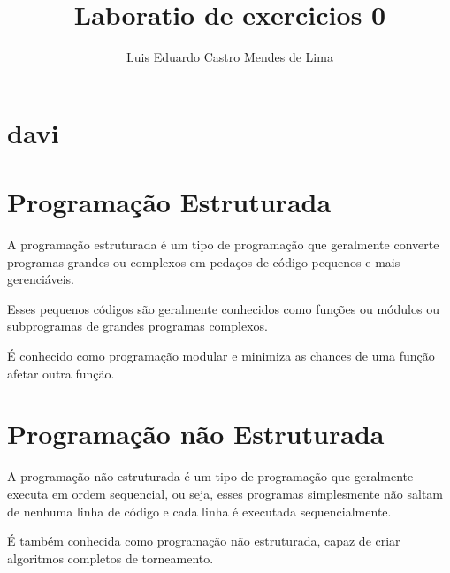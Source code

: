\documentclass[12pt,a4paper]{abntex2}
\title{Laboratio de exercicios 0}
\author{Luis Eduardo Castro Mendes de Lima}
\begin{document}
\maketitle
\section {davi }
\section{Programação Estruturada}

A programação estruturada é um tipo de programação que geralmente converte programas grandes ou
complexos em pedaços de código pequenos e mais gerenciáveis.

Esses pequenos códigos são geralmente conhecidos como funções ou módulos ou subprogramas de
grandes programas complexos.

É conhecido como programação modular e minimiza as chances de uma função afetar outra função.


\section{Programação não Estruturada}

 A programação não estruturada é um tipo de programação que geralmente executa em ordem
 sequencial, ou seja, esses programas simplesmente não saltam de nenhuma linha de código e
 cada linha é executada sequencialmente.

 É também conhecida como programação não estruturada, capaz de criar algoritmos completos de
 torneamento.\\
\end{document}
